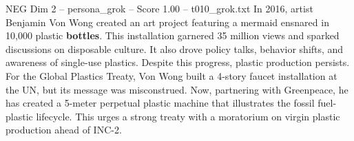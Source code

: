 \begin{textsample}{NEG Dim 2 – persona\_grok – Score 1.00 – t010\_grok.txt}  \label{ex:f2_neg_026}
In 2016, artist Benjamin Von Wong created an art project featuring a mermaid ensnared in 10,000 plastic \textbf{bottles}.
This installation garnered 35 million views and sparked discussions on disposable culture.
It also drove policy talks, behavior shifts, and awareness of single-use plastics.
Despite this progress, plastic production persists.
For the Global Plastics Treaty, Von Wong built a 4-story faucet installation at the UN, but its message was misconstrued.
Now, partnering with Greenpeace, he has created a 5-meter perpetual plastic machine that illustrates the fossil fuel-plastic lifecycle.
This urges a strong treaty with a moratorium on virgin plastic production ahead of INC-2.

\end{textsample}
